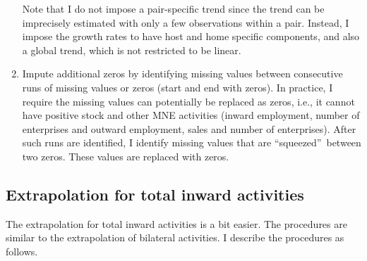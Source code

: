 \documentclass[notitlepage,11pt]{article}%
\begin{document}
\begin{enumerate}
Note that I do not impose a pair-specific trend since the trend can be
imprecisely estimated with only a few observations within a pair. Instead, I
impose the growth rates to have host and home specific components, and also a
global trend, which is not restricted to be linear.

\item Impute additional zeros by identifying missing values between
consecutive runs of missing values or zeros (start and end with zeros). In
practice, I require the missing values can potentially be replaced as zeros,
i.e., it cannot have positive stock and other MNE activities (inward
employment, number of enterprises and outward employment, sales and number of
enterprises). After such runs are identified, I identify missing values that
are \textquotedblleft squeezed\textquotedblright\ between two zeros. These
values are replaced with zeros.
\end{enumerate}

\subsection{Extrapolation for total inward activities}

The extrapolation for total inward activities is a bit easier. The procedures
are similar to the extrapolation of bilateral activities. I describe the
procedures as follows.
\end{document}
